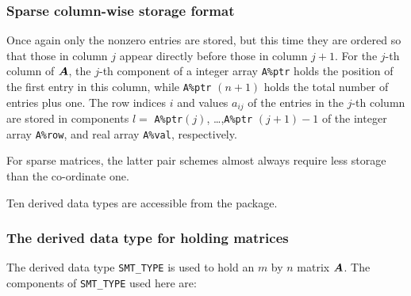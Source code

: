 \documentclass{galahad}
\begin{document}
\subsubsection{Sparse column-wise storage format}\label{columnwise}
Once again only the nonzero entries are stored, but this time
they are ordered so that those in column $j$ appear directly before those
in column $j+1$. For the $j$-th column of ${\bm{A}}$, the $j$-th component of a
integer array {\tt A\%ptr} holds the position of the first entry in this column,
while {\tt A\%ptr} $(n+1)$ holds the total number of entries plus one.
The row indices $i$ and values $a_{ij}$ of the entries in the $j$-th column
are stored in components
$l =$ {\tt A\%ptr}$(j)$, \ldots ,{\tt A\%ptr} $(j+1)-1$ of the
integer array {\tt A\%row}, and real array {\tt A\%val}, respectively.

For sparse matrices, the latter pair schemes almost always require less
storage than the co-ordinate one.








\galtypes
Ten derived data types are accessible from the package.


\subsubsection{The derived data type for holding matrices}\label{typesmt}
The derived data type {\tt SMT\_TYPE} is used to hold an $m$ by $n$ 
matrix ${\bm{A}}$. The components of {\tt SMT\_TYPE} used here are:
\end{document}
